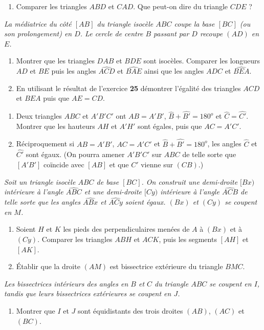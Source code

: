 \begin{itemize}
\begin{enumerate}
\item Comparer les triangles $ABD$ et $CAD$. Que peut-on dire du triangle $CDE$ ?
\end{enumerate}
\it La médiatrice du côté $[AB]$ du triangle isocèle $ABC$ coupe la base $[BC]$ (ou son prolongement) en $D$. Le cercle de centre $B$ passant par $D$ recoupe $(AD)$ en $E$. 
\begin{enumerate}
\item Montrer que les triangles $DAB$ et $BDE$ sont isocèles. Comparer les longueurs $AD$ et $BE$ puis les angles $\widehat{ACD}$ et $\widehat{BAE}$ ainsi que les angles $\widehat{ADC}$ et $\widehat{BEA}$.
\item En utilisant le résultat de l'exercice \textbf{25} démontrer l'égalité des triangles $ACD$ et $BEA$ puis que $AE=CD$.
\end{enumerate}
\it \begin{enumerate}
\item Deux triangles $ABC$ et $A'B'C'$ ont $AB=A'B'$, $\widehat{B}+\widehat{B'}= 180^o$ et $\widehat{C}= \widehat{C'}$. Montrer que les hauteurs $AH$ et $A'H'$ sont égales, puis que $AC=A'C'$. 
\item Réciproquement si $AB=A'B'$, $AC=A'C'$ et $\widehat{B}+\widehat{B'}= 180^o$, les angles $\widehat{C}$ et $\widehat{C'}$ sont égaux. (On pourra amener $A'B'C'$ sur $ABC$ de telle sorte que $[A'B']$ coïncide avec $[AB]$ et que $C'$ vienne sur $(CB)$.)
\end{enumerate}
\it Soit un triangle isocèle $ABC$ de base $[BC]$. On
construit une demi-droite $[Bx)$ intérieure à l'angle $\widehat{ABC}$ et une demi-droite $[Cy)$ intérieure à l'angle $\widehat{ACB}$ de telle sorte que les angles $\widehat{ABx}$ et $\widehat{ACy}$ soient égaux. $(Bx)$ et $(Cy)$ se coupent en $M$.
\begin{enumerate}
\item Soient $H$ et $K$ les pieds des perpendiculaires menées de $A$ à $(Bx)$ et à $(Cy)$. Comparer les triangles $ABH$ et $ACK$, puis les segments $[AH]$ et $[AK]$.
\item Établir que la droite $(AM)$ est bissectrice extérieure du triangle $BMC$.
\end{enumerate}
\it Les bissectrices intérieurs des angles en $B$ et $C$ du triangle $ABC$ se coupent en $I$, tandis que leurs bissectrices extérieures se coupent en $J$.\begin{enumerate}
\item Montrer que $I$ et $J$ sont équidistants des trois droites $(AB)$, $(AC)$ et $(BC)$.

\end{enumerate}
\end{itemize}
